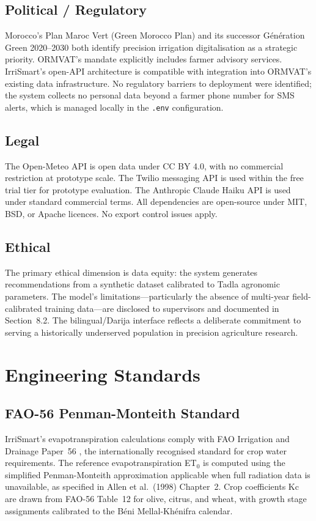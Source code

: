 \documentclass[12pt,a4paper]{report}
\begin{document}
\section{Political / Regulatory}
Morocco's Plan Maroc Vert (Green Morocco Plan) and its successor Génération Green 2020--2030 both identify precision irrigation digitalisation as a strategic priority. ORMVAT's mandate explicitly includes farmer advisory services. IrriSmart's open-API architecture is compatible with integration into ORMVAT's existing data infrastructure. No regulatory barriers to deployment were identified; the system collects no personal data beyond a farmer phone number for SMS alerts, which is managed locally in the \texttt{.env} configuration.

\section{Legal}
The Open-Meteo API is open data under CC BY 4.0, with no commercial restriction at prototype scale. The Twilio messaging API is used within the free trial tier for prototype evaluation. The Anthropic Claude Haiku API is used under standard commercial terms. All dependencies are open-source under MIT, BSD, or Apache licences. No export control issues apply.

\section{Ethical}
The primary ethical dimension is data equity: the system generates recommendations from a synthetic dataset calibrated to Tadla agronomic parameters. The model's limitations---particularly the absence of multi-year field-calibrated training data---are disclosed to supervisors and documented in Section~8.2. The bilingual/Darija interface reflects a deliberate commitment to serving a historically underserved population in precision agriculture research.

\chapter{Engineering Standards}

\section{FAO-56 Penman-Monteith Standard}
IrriSmart's evapotranspiration calculations comply with FAO Irrigation and Drainage Paper~56 \cite{allen1998}, the internationally recognised standard for crop water requirements. The reference evapotranspiration ET$_0$ is computed using the simplified Penman-Monteith approximation applicable when full radiation data is unavailable, as specified in Allen et al.\ (1998) Chapter~2. Crop coefficients Kc are drawn from FAO-56 Table~12 for olive, citrus, and wheat, with growth stage assignments calibrated to the Béni Mellal-Khénifra calendar.
\end{document}
